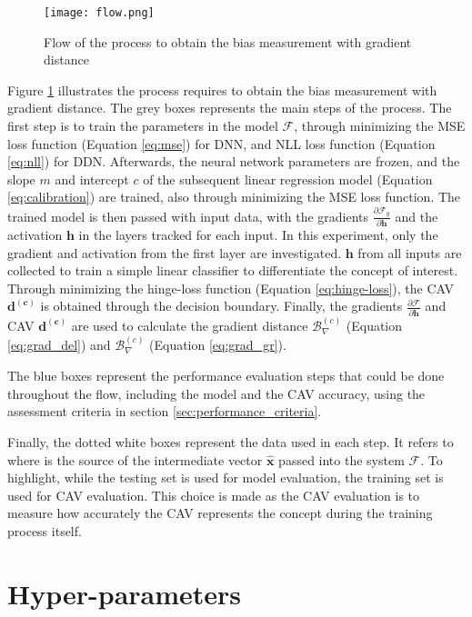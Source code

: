 \begin{figure}[H]
    \centering
    \texttt{[image: flow.png]}
    \caption{Flow of the process to obtain the bias measurement with gradient distance}
    \label{fig:flow}
\end{figure}

Figure \ref{fig:flow} illustrates the process requires to obtain the bias measurement with gradient distance. The grey boxes represents the main steps of the process. The first step is to train the parameters in the model $\mathcal{F}$, through minimizing the MSE loss function (Equation \ref{eq:mse}) for DNN, and NLL loss function (Equation \ref{eq:nll}) for DDN. Afterwards, the neural network parameters are frozen, and the slope $m$ and intercept $c$ of the subsequent linear regression model (Equation \ref{eq:calibration}) are trained, also through minimizing the MSE loss function. The trained model is then passed with input data, with the gradients $\frac{\partial \mathcal{F}_y}{\partial \boldsymbol{h}}$ and the activation $\boldsymbol{h}$ in the layers tracked for each input. In this experiment, only the gradient and activation from the first layer are investigated. $\boldsymbol{h}$ from all inputs are collected to train a simple linear classifier to differentiate the concept of interest. Through minimizing the hinge-loss function (Equation \ref{eq:hinge-loss}), the CAV $\boldsymbol{d^{(c)}}$ is obtained through the decision boundary. Finally, the gradients $\frac{\partial \mathcal{F}}{\partial \boldsymbol{h}}$ and CAV $\boldsymbol{d^{(c)}}$ are used to calculate the gradient distance $\mathcal{B}^{(c)}_{\nabla}$ (Equation \ref{eq:grad_del}) and $\mathcal{B}^{(c)}_{\nabla}$ (Equation \ref{eq:grad_gr}).

The blue boxes represent the performance evaluation steps that could be done throughout the flow, including the model and the CAV accuracy, using the assessment criteria in section \ref{sec:performance_criteria}.

Finally, the dotted white boxes represent the data used in each step. It refers to where is the source of the intermediate vector $\mathbf{\hat{x}}$ passed into the system $\mathcal{F}$. To highlight, while the testing set is used for model evaluation, the training set is used for CAV evaluation. This choice is made as the CAV evaluation is to measure how accurately the CAV represents the concept during the training process itself.

\section{Hyper-parameters}
